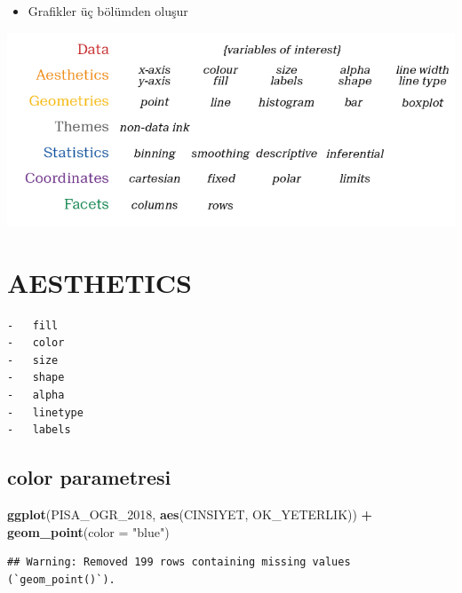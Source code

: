 \documentclass[
  oneside]{book}
\newenvironment{Shaded}{\begin{snugshade}}{\end{snugshade}}
\newcommand{\AttributeTok}[1]{\textcolor[rgb]{0.13,0.29,0.53}{#1}}
\newcommand{\FunctionTok}[1]{\textcolor[rgb]{0.13,0.29,0.53}{\textbf{#1}}}
\newcommand{\NormalTok}[1]{#1}
\newcommand{\SpecialCharTok}[1]{\textcolor[rgb]{0.81,0.36,0.00}{\textbf{#1}}}
\newcommand{\StringTok}[1]{\textcolor[rgb]{0.31,0.60,0.02}{#1}}
\providecommand{\tightlist}{%
  \setlength{\itemsep}{0pt}\setlength{\parskip}{0pt}}
\begin{document}
\begin{itemize}
\tightlist
\item
  Grafikler üç bölümden oluşur
\end{itemize}

\includegraphics{images/v3.PNG}

\hypertarget{aesthetics}{%
\section{\texorpdfstring{\textbf{AESTHETICS}}{AESTHETICS}}\label{aesthetics}}

\begin{verbatim}
-   fill
-   color
-   size
-   shape
-   alpha
-   linetype
-   labels
\end{verbatim}

\hypertarget{color-parametresi}{%
\subsection{\texorpdfstring{\textbf{color} parametresi}{color parametresi}}\label{color-parametresi}}

\begin{Shaded}
\begin{Highlighting}[]
\FunctionTok{ggplot}\NormalTok{(PISA\_OGR\_2018, }\FunctionTok{aes}\NormalTok{(CINSIYET, OK\_YETERLIK)) }\SpecialCharTok{+}
  \FunctionTok{geom\_point}\NormalTok{(}\AttributeTok{color =} \StringTok{"blue"}\NormalTok{)}
\end{Highlighting}
\end{Shaded}

\begin{verbatim}
## Warning: Removed 199 rows containing missing values (`geom_point()`).
\end{verbatim}
\end{document}
